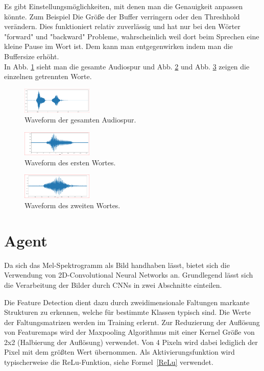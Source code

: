 \documentclass[sigconf]{acmart}
\begin{document}
Es gibt Einstellungsmöglichkeiten, mit denen man die Genauigkeit anpassen könnte. Zum Beispiel Die Größe der Buffer verringern oder den Threshhold verändern.
Dies funktioniert relativ zuverlässig und hat nur bei den Wörter "forward" und "backward" Probleme, wahrscheinlich weil dort beim Sprechen eine kleine Pause im Wort ist. Dem kann man entgegenwirken indem man die Buffersize erhöht. \\
In Abb. \ref{fig:Audio} sieht man die gesamte Audiospur und Abb. \ref{fig:Audio1} und Abb. \ref{fig:Audio2} zeigen die einzelnen getrennten Worte.

\begin{figure}[ht]
  \includegraphics[width=0.3\textwidth]{images/Audio1}
  \caption{Waveform der gesamten Audiospur.}
  \Description{}
  \label{fig:Audio}
\end{figure} 
\begin{figure}[ht]
  \includegraphics[width=0.3\textwidth]{images/Audio2}
  \caption{Waveform des ersten Wortes.}
  \Description{}
  \label{fig:Audio1}
\end{figure} 
\begin{figure}[ht]
  \includegraphics[width=0.3\textwidth]{images/Audio3}
  \caption{Waveform des zweiten Wortes.}
  \Description{}
  \label{fig:Audio2}
\end{figure} 

\section{Agent}
Da sich das Mel-Spektrogramm als Bild handhaben lässt, bietet sich die Verwendung von 2D-Convolutional Neural Networks an. Grundlegend lässt sich die Verarbeitung der Bilder durch CNNs in zwei Abschnitte einteilen. 

Die Feature Detection dient dazu durch zweidimensionale Faltungen markante Strukturen zu erkennen, welche für bestimmte Klassen typisch sind. Die Werte der Faltungsmatrizen werden im Training erlernt. Zur Reduzierung der Auflösung von Featuremaps wird der Maxpooling Algorithmus mit einer Kernel Größe von 2x2 (Halbierung der Auflösung) verwendet. Von 4 Pixeln wird dabei lediglich der Pixel mit dem größten Wert übernommen. Als Aktivierungsfunktion wird typischerweise die ReLu-Funktion, siehe Formel~\ref{ReLu} verwendet. 
\end{document}
